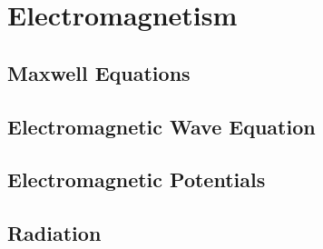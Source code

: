 \chapter{Electromagnetism}

\section{Maxwell Equations}
\TODO

\section{Electromagnetic Wave Equation}


\section{Electromagnetic Potentials}
\TODO

\section{Radiation}
\TODO
